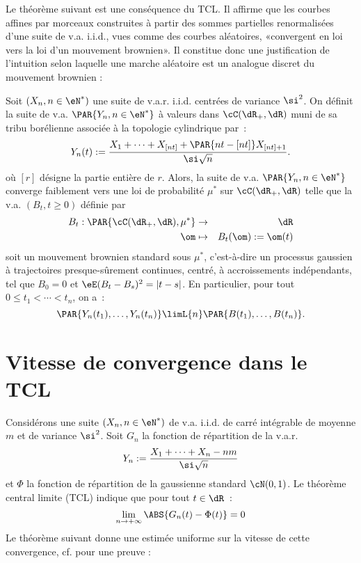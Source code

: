 %
Le théorème suivant est une conséquence du TCL. Il affirme que les courbes
affines par morceaux construites à partir des sommes partielles renormalisées
d'une suite de v.a. i.i.d., vues comme des courbes aléatoires, «convergent en
loi vers la loi d'un mouvement brownien». Il constitue donc une justification
de l'intuition selon laquelle une marche aléatoire est un analogue discret du
mouvement brownien :

\begin{theorem}\label{th:pid}
  Soit $(X_n,n\in\eN^*)$ une suite de v.a.r. i.i.d. centrées de variance
  $\si^2$. On définit la suite de v.a. $\PAR{Y_n,n \in \eN^*}$ à valeurs dans
  $\cC(\dR_+,\dR)$ muni de sa tribu borélienne associée à la topologie
  cylindrique par~:
  $$
  Y_n(t):=\frac{X_1+\cdots+X_{[nt]}+\PAR{nt-[nt]}X_{[nt]+1}}{\si\sqrt{n}}.
  $$
  où $[r]$ désigne la partie entière de $r$.  Alors, la suite de v.a.
  $\PAR{Y_n,n\in\eN^*}$ converge faiblement vers une loi de probabilité $\mu^*$
  sur $\cC(\dR_+,\dR)$ telle que la v.a. $(B_t,t\geq0)$ définie par
  \begin{eqnarray*}
  B_t:\PAR{\cC(\dR_+,\dR),\mu^*}&\to&\dR\\
  \om&\mapsto&B_t(\om):=\om(t)
  \end{eqnarray*}
  soit un mouvement brownien standard sous $\mu^*$, c'est-à-dire un processus
  gaussien à trajectoires presque-sûrement continues, centré, à accroissements
  indépendants, tel que $B_0=0$ et $\eE(B_t-B_s)^2=|t-s|$.  En particulier,
  pour tout $0\leq t_1<\cdots<t_n$, on a~:
  $$
  \PAR{Y_n(t_1),\ldots,Y_n(t_n)}\limL{n}\PAR{B(t_1),\ldots,B(t_n)}.
  $$
\end{theorem}

%
\section{Vitesse de convergence dans le TCL}
%

Considérons une suite $(X_n,n\in\eN^*)$ de v.a. i.i.d. de carré intégrable de
moyenne $m$ et de variance $\si^2$. Soit $G_n$ la fonction de répartition de
la v.a.r.
$$
Y_n:=\frac{X_1+\cdots+X_n-nm}{\si\sqrt{n}}
$$
et $\Phi$ la fonction de répartition de la gaussienne standard $\cN(0,1)$. Le
théorème central limite (TCL) indique que pour tout $t\in\dR$~:
$$
\lim_{n\to+\infty}\ABS{G_n(t)-\Phi(t)}=0
$$
Le théorème suivant donne une estimée uniforme sur la vitesse de cette
convergence, cf. \cite{petrov} pour une preuve :

